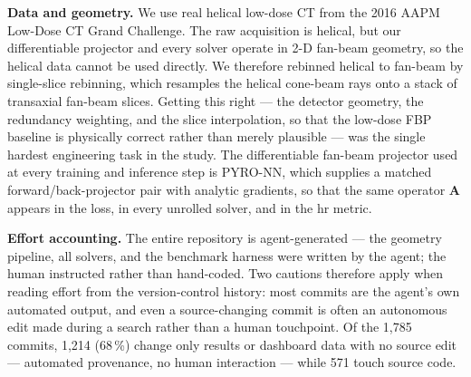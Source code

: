 \documentclass[AMA,twocolumn]{USG}
\begin{document}
\textbf{Data and geometry.} We use real helical low-dose CT from the 2016 AAPM Low-Dose CT Grand Challenge.\cite{mccollough2017mayo} The raw acquisition is helical, but our differentiable projector and every solver operate in 2-D fan-beam geometry, so the helical data cannot be used directly. We therefore rebinned helical to fan-beam by single-slice rebinning,\cite{noo1999singleslice} which resamples the helical cone-beam rays onto a stack of transaxial fan-beam slices. Getting this right --- the detector geometry, the redundancy weighting, and the slice interpolation, so that the low-dose FBP baseline is physically correct rather than merely plausible --- was the single hardest engineering task in the study. The differentiable fan-beam projector used at every training and inference step is PYRO-NN,\cite{syben2019pyronn} which supplies a matched forward/back-projector pair with analytic gradients, so that the same operator $\mathbf{A}$ appears in the loss, in every unrolled solver, and in the hr metric.

\textbf{Effort accounting.} The entire repository is agent-generated --- the geometry pipeline, all solvers, and the benchmark harness were written by the agent; the human instructed rather than hand-coded. Two cautions therefore apply when reading effort from the version-control history: most commits are the agent's own automated output, and even a source-changing commit is often an autonomous edit made during a search rather than a human touchpoint. Of the 1{,}785 commits, 1{,}214 (68\,\%) change only results or dashboard data with no source edit --- automated provenance, no human interaction --- while 571 touch source code.
\end{document}
